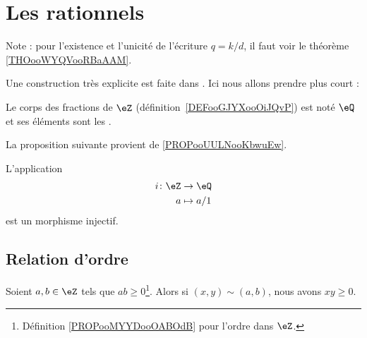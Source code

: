 

\section{Les rationnels}

Note : pour l'existence et l'unicité de l'écriture \( q=k/d\), il faut voir le théorème \ref{THOooWYQVooRBaAAM}.


Une construction très explicite est faite dans \cite{RWWJooJdjxEK}. Ici nous allons prendre plus court :
\begin{definition}		\label{DEFooBPJNooRqrblS}
	Le corps des fractions de \( \eZ\) (définition~\ref{DEFooGJYXooOiJQvP}) est noté \( \eQ\) et ses éléments sont les .
\end{definition}


La proposition suivante provient de \ref{PROPooUULNooKbwuEw}.
\begin{proposition}	\label{PROPooKUIYooCxMHTX}
	L'application
	\begin{equation}
		\begin{aligned}
			i\colon \eZ & \to \eQ     \\
			a           & \mapsto a/1
		\end{aligned}
	\end{equation}
	est un morphisme injectif.
\end{proposition}



\subsection{Relation d'ordre}

\begin{proposition}	\label{PROPooEBCHooYEQkIO}
	Soient \( a,b\in \eZ\) tels que \( ab\geq 0\)\footnote{Définition \ref{PROPooMYYDooOABOdB} pour l'ordre dans \( \eZ\).}. Alors si \( (x,y)\sim(a,b)\), nous avons \( xy\geq 0\).
\end{proposition}

